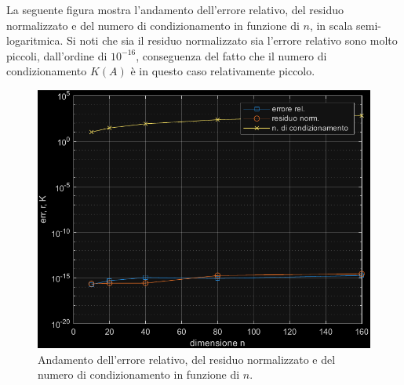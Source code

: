 \begin{enumerate}
    La seguente figura mostra l'andamento dell'errore relativo, del residuo normalizzato e del numero di condizionamento in funzione di $n$, in scala semi-logaritmica. Si noti che sia il residuo normalizzato sia l'errore relativo sono molto piccoli, dall'ordine di $10^{-16}$, conseguenza del fatto che il numero di condizionamento $K\left(A\right)$ è in questo caso relativamente piccolo.

    \begin{figure}[!htp]
        \centering
        \includegraphics[width=.7\textwidth]{img/metodi-diretti.pdf}
        \caption{Andamento dell'errore relativo, del residuo normalizzato e del numero di condizionamento in funzione di $n$.}
    \end{figure}
\end{enumerate}